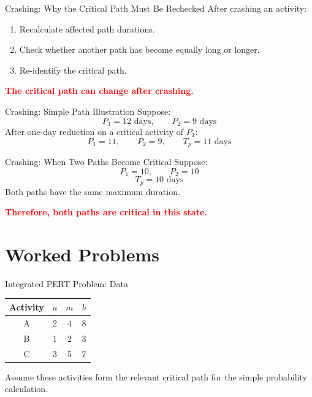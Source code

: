 \documentclass[aspectratio=169,10pt]{beamer}
\newcommand{\criticaltext}[1]{\begin{center}\parbox{0.78\textwidth}{\centering\textcolor{Red}{\textbf{#1}}}\end{center}}
\begin{document}
\begin{frame}{Crashing: Why the Critical Path Must Be Rechecked}
After crashing an activity:
\begin{enumerate}
  \item Recalculate affected path durations.
  \item Check whether another path has become equally long or longer.
  \item Re-identify the critical path.
\end{enumerate}
\vspace{0.2cm}
\criticaltext{The critical path can change after crashing.}
\end{frame}

\begin{frame}{Crashing: Simple Path Illustration}
Suppose:
\[
P_1=12\text{ days},\qquad P_2=9\text{ days}
\]
\pause
After one-day reduction on a critical activity of $P_1$:
\[
P_1=11,\qquad P_2=9,\qquad T_p=\boxed{11\text{ days}}
\]
\end{frame}

\begin{frame}{Crashing: When Two Paths Become Critical}
Suppose:
\[
P_1=10,\qquad P_2=10
\]
\pause
\[
T_p=\boxed{10\text{ days}}
\]
Both paths have the same maximum duration.
\criticaltext{Therefore, both paths are critical in this state.}
\end{frame}

\section{Worked Problems}

\begin{frame}{Integrated PERT Problem: Data}
\centering
\begin{tabular}{c|ccc}
\toprule
Activity & $a$ & $m$ & $b$\\
\midrule
A & 2 & 4 & 8\\
B & 1 & 2 & 3\\
C & 3 & 5 & 7\\
\bottomrule
\end{tabular}
\vspace{0.3cm}

Assume these activities form the relevant critical path for the simple probability calculation.
\end{frame}
\end{document}

